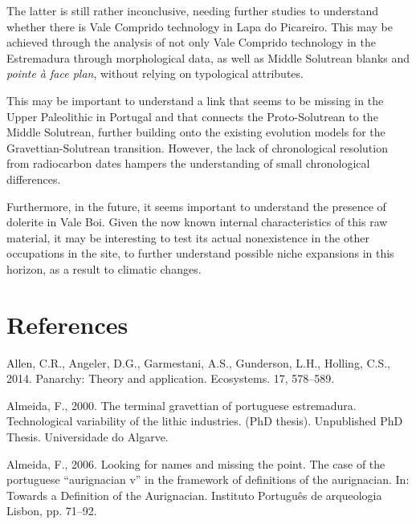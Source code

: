 \documentclass[12pt,twoside]{reedthesis}
\begin{document}
The latter is still rather inconclusive, needing further studies to understand whether there is Vale Comprido technology in Lapa do Picareiro. This may be achieved through the analysis of not only Vale Comprido technology in the Estremadura through morphological data, as well as Middle Solutrean blanks and \emph{pointe à face plan}, without relying on typological attributes.

This may be important to understand a link that seems to be missing in the Upper Paleolithic in Portugal and that connects the Proto-Solutrean to the Middle Solutrean, further building onto the existing evolution models for the Gravettian-Solutrean transition. However, the lack of chronological resolution from radiocarbon dates hampers the understanding of small chronological differences.

Furthermore, in the future, it seems important to understand the presence of dolerite in Vale Boi. Given the now known internal characteristics of this raw material, it may be interesting to test its actual nonexistence in the other occupations in the site, to further understand possible niche expansions in this horizon, as a result to climatic changes.

\hypertarget{references}{%
\chapter*{References}\label{references}}


\noindent
\singlespacing

\setlength{\parindent}{-0.20in}
\setlength{\leftskip}{0.20in}
\setlength{\parskip}{8pt}

\hypertarget{refs}{}
\leavevmode\hypertarget{ref-allen2014}{}%
Allen, C.R., Angeler, D.G., Garmestani, A.S., Gunderson, L.H., Holling, C.S., 2014. Panarchy: Theory and application. Ecosystems. 17, 578--589.

\leavevmode\hypertarget{ref-almeida2000}{}%
Almeida, F., 2000. The terminal gravettian of portuguese estremadura. Technological variability of the lithic industries. (PhD thesis). Unpublished PhD Thesis. Universidade do Algarve.

\leavevmode\hypertarget{ref-almeida2006}{}%
Almeida, F., 2006. Looking for names and missing the point. The case of the portuguese ``aurignacian v'' in the framework of definitions of the aurignacian. In: Towards a Definition of the Aurignacian. Instituto Português de arqueologia Lisbon, pp. 71--92.
\end{document}
